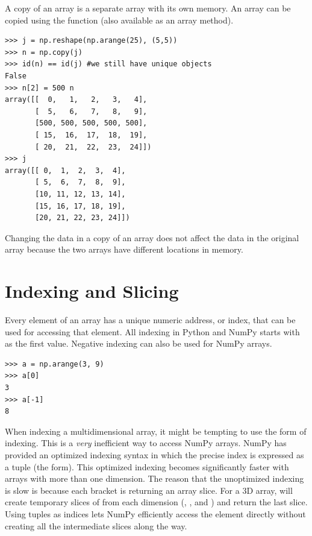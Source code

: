 A copy of an array is a separate array with its own memory. An array can
be copied using the  function (also available as an array
method). 

\begin{lstlisting}
>>> j = np.reshape(np.arange(25), (5,5))
>>> n = np.copy(j) 
>>> id(n) == id(j) #we still have unique objects
False
>>> n[2] = 500 n
array([[  0,   1,   2,   3,   4],
       [  5,   6,   7,   8,   9],
       [500, 500, 500, 500, 500],
       [ 15,  16,  17,  18,  19],
       [ 20,  21,  22,  23,  24]])
>>> j
array([[ 0,  1,  2,  3,  4],
       [ 5,  6,  7,  8,  9],
       [10, 11, 12, 13, 14],
       [15, 16, 17, 18, 19],
       [20, 21, 22, 23, 24]])
\end{lstlisting} 
Changing the data in a copy of an array does not affect the data in the 
original array because the two arrays have different locations in memory.

\section*{Indexing and Slicing} Every element of an array has a unique
numeric address, or index, that can be used for accessing that element.
All indexing in Python and NumPy starts with  as the first value. 
Negative indexing can also be used for NumPy arrays. 
\begin{lstlisting}
>>> a = np.arange(3, 9) 
>>> a[0]
3
>>> a[-1]
8 
\end{lstlisting} 
When indexing a multidimensional array, it might be
tempting to use the  form of indexing. This is a \emph{very}
inefficient way to access NumPy arrays. NumPy has provided an optimized
indexing syntax in which the precise index is expressed as a tuple (the
 form).  This optimized indexing becomes significantly
faster with arrays with more than one dimension. The reason that the
unoptimized indexing is slow is because each bracket is returning an
array slice. For a 3D array,  will create temporary
slices of  from each dimension (, , and
) and return the last slice. Using tuples as indices lets
NumPy efficiently access the element directly without creating all the
intermediate slices along the way.

